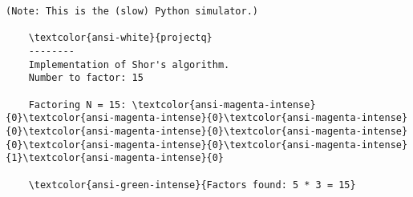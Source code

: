 \documentclass[11pt]{article}
\begin{document}
    \begin{Verbatim}[commandchars=\\\{\}]
(Note: This is the (slow) Python simulator.)

	\textcolor{ansi-white}{projectq}
	--------
	Implementation of Shor's algorithm.
	Number to factor: 15

	Factoring N = 15: \textcolor{ansi-magenta-intense}{0}\textcolor{ansi-magenta-intense}{0}\textcolor{ansi-magenta-intense}{0}\textcolor{ansi-magenta-intense}{0}\textcolor{ansi-magenta-intense}{0}\textcolor{ansi-magenta-intense}{0}\textcolor{ansi-magenta-intense}{1}\textcolor{ansi-magenta-intense}{0}

	\textcolor{ansi-green-intense}{Factors found: 5 * 3 = 15}

    \end{Verbatim}


    
    
    
    
\end{document}

